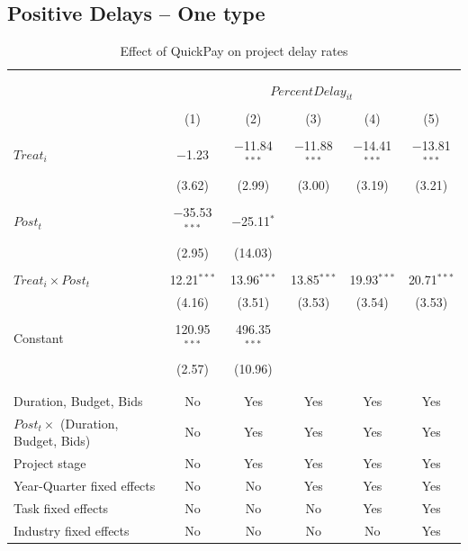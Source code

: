 \documentclass[
]{article}
\begin{document}
\hypertarget{positive-delays-one-type}{%
\subsection{Positive Delays -- One
type}\label{positive-delays-one-type}}

\begin{table}[H] \centering 
  \caption{Effect of QuickPay on project delay rates} 
  \label{} 
\small 
\begin{tabular}{@{\extracolsep{-2pt}}lccccc} 
\\[-1.8ex]\hline 
\hline \\[-1.8ex] 
\\[-1.8ex] & \multicolumn{5}{c}{$PercentDelay_{it}$} \\ 
\\[-1.8ex] & (1) & (2) & (3) & (4) & (5)\\ 
\hline \\[-1.8ex] 
 $Treat_i$ & $-$1.23 & $-$11.84$^{***}$ & $-$11.88$^{***}$ & $-$14.41$^{***}$ & $-$13.81$^{***}$ \\ 
  & (3.62) & (2.99) & (3.00) & (3.19) & (3.21) \\ 
  & & & & & \\ 
 $Post_t$ & $-$35.53$^{***}$ & $-$25.11$^{*}$ &  &  &  \\ 
  & (2.95) & (14.03) &  &  &  \\ 
  & & & & & \\ 
 $Treat_i \times Post_t$ & 12.21$^{***}$ & 13.96$^{***}$ & 13.85$^{***}$ & 19.93$^{***}$ & 20.71$^{***}$ \\ 
  & (4.16) & (3.51) & (3.53) & (3.54) & (3.53) \\ 
  & & & & & \\ 
 Constant & 120.95$^{***}$ & 496.35$^{***}$ &  &  &  \\ 
  & (2.57) & (10.96) &  &  &  \\ 
  & & & & & \\ 
\hline \\[-1.8ex] 
Duration, Budget, Bids & No & Yes & Yes & Yes & Yes \\ 
$Post_t \times$  (Duration, Budget, Bids) & No & Yes & Yes & Yes & Yes \\ 
Project stage & No & Yes & Yes & Yes & Yes \\ 
Year-Quarter fixed effects & No & No & Yes & Yes & Yes \\ 
Task fixed effects & No & No & No & Yes & Yes \\ 
Industry fixed effects & No & No & No & No & Yes \\ 

\end{tabular}
\end{table}
\end{document}
